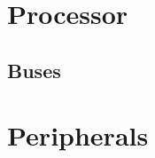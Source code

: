 




\renewcommand{\thepage}{\Alph{part}\arabic{chapter}-\arabic{page}}
\renewcommand{\thefigure}{\Alph{part}\arabic{chapter}.\arabic{figure}}
\renewcommand{\theschematic}{\Alph{part}\arabic{chapter}.\arabic{schematic}}
\renewcommand{\thetable}{\Alph{part}\arabic{chapter}.\arabic{schematic}}
\renewcommand{\thepage}{\thepart\thechapter-\arabic{page}}

\ifdefined\renderpartprocessor
  \part{Processor}
  \glsresetall

%  

  \chapter{Buses}
  \glsresetall
  

%  

%  
  
\fi

\ifdefined\renderpartperipherals
\part{Peripherals}
  \ifdefined\renderchappfp
